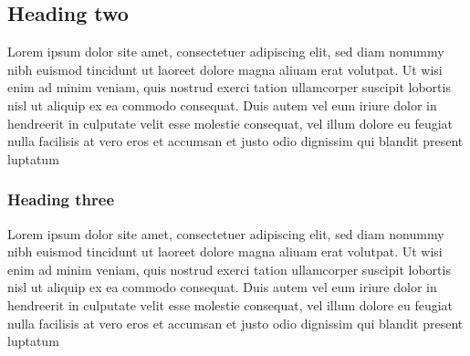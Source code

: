 \documentclass{csnote}
\begin{document}
\subsection{Heading two}

Lorem ipsum dolor site amet, consectetuer adipiscing elit, sed diam nonummy nibh euismod tincidunt ut laoreet dolore magna aliuam erat volutpat. Ut wisi enim ad minim veniam, quis nostrud exerci tation ullamcorper suscipit lobortis nisl ut aliquip ex ea commodo consequat. Duis autem vel eum iriure dolor in hendreerit in culputate velit esse molestie consequat, vel illum dolore eu feugiat nulla facilisis at vero eros et accumsan et justo odio dignissim qui blandit present luptatum  

\subsubsection{Heading three}

Lorem ipsum dolor site amet, consectetuer adipiscing elit, sed diam nonummy nibh euismod tincidunt ut laoreet dolore magna aliuam erat volutpat. Ut wisi enim ad minim veniam, quis nostrud exerci tation ullamcorper suscipit lobortis nisl ut aliquip ex ea commodo consequat. Duis autem vel eum iriure dolor in hendreerit in culputate velit esse molestie consequat, vel illum dolore eu feugiat nulla facilisis at vero eros et accumsan et justo odio dignissim qui blandit present luptatum  
\end{document}
